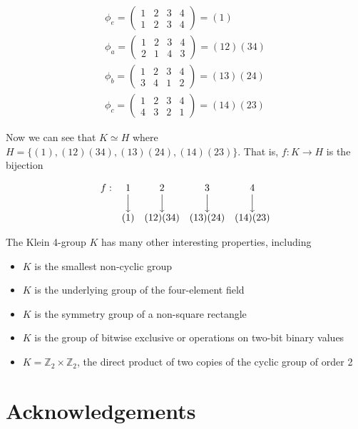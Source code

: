 \documentclass[11pt, oneside]{article}   	%
\theoremstyle{definition}
\DeclareMathOperator{\bda}{\Big \downarrow}
\begin{document}
\bigskip
\begin{equation*}
\begin{array}{llll}
\phi_{e} = \begin{pmatrix} 1 & 2 & 3 & 4  \\ 1 & 2 & 3 & 4  \end{pmatrix}  = (1)         \\
\phi_{a} = \begin{pmatrix} 1 & 2 & 3 & 4  \\ 2 & 1 & 4 & 3 \end{pmatrix}   = (12)(34) \\
\phi_{b} = \begin{pmatrix} 1 & 2 & 3 & 4  \\  3 & 4 & 1 & 2 \end{pmatrix}  = (13)(24)  \\
\phi_{c} = \begin{pmatrix} 1 & 2 & 3 & 4  \\  4 & 3 & 2 & 1 \end{pmatrix}   = (14)(23)                                 
\end{array} 
\end{equation*}

\bigskip
\noindent
Now we can see that $K \simeq H$ where $H = \{(1), (12)(34), (13)(24), (14)(23)\}$. That is, 
$f:K\rightarrow H$ is the bijection

\bigskip
\begin{equation*}
\begin{array}{c c c c c}
f: &  1   & 2        & 3        & 4 \\
   & \bda & \bda     & \bda     & \bda \\
   & (1)  & (12)(34) & (13)(24) &  (14)(23)
\end{array}
\end{equation*}

\bigskip
\noindent
The Klein 4-group $K$ has many other interesting properties, including

\begin{itemize}
\item $K$ is the smallest non-cyclic group
\item $K$ is the underlying group of the four-element field
\item $K$ is the symmetry group of a non-square rectangle 
\item $K$ is the group of bitwise exclusive or operations on two-bit binary values
\item $K = \mathbb{Z}_2 \times \mathbb{Z}_2$, the direct product of two copies of the cyclic group of order 2
\end{itemize}


\section{Acknowledgements}

\newpage


\end{document}
